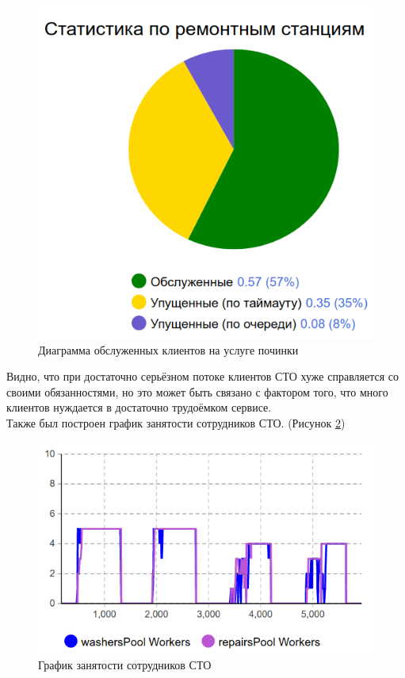 \documentclass[14pt,fleqn]{extarticle}
\begin{document}
	\begin{figure}[h]
		\centering \includegraphics[scale=0.35]{carwashing_anylogic_repairing}
		\caption{Диаграмма обслуженных клиентов на услуге починки}
		\label{fig:carwashing_anylogic_repairing}
	\end{figure}
	
	Видно, что при достаточно серьёзном потоке клиентов СТО хуже справляется со своими обязанностями, но это может быть связано с фактором того, что много клиентов нуждается в достаточно трудоёмком сервисе.\\
	
	Также был построен график занятости сотрудников СТО. (Рисунок \ref{fig:carwashing_anylogic_workers})
	
	\begin{figure}[h]
		\centering \includegraphics[scale=0.5]{carwashing_anylogic_workers}
		\caption{График занятости сотрудников СТО}
		\label{fig:carwashing_anylogic_workers}
	\end{figure}
\end{document}
